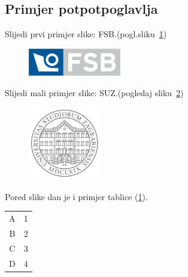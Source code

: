 \documentclass[a4paper,12pt]{report}
\begin{document}
\subsection{Primjer potpotpoglavlja}

Slijedi prvi primjer slike: FSB.(pogl.sliku~\ref{figa1})
%

\begin{figure}[h]
  \centering
  \includegraphics[height=1.2cm]{fsb_logo_n}\\
  \label{figa1}
\end{figure}

\clearpage
Slijedi mali primjer slike: SUZ.(pogledaj sliku~\ref{figa2})
%

\begin{figure}
  \centering
  \includegraphics[height=3.2cm]{unizg_sivi_t4s}\\
  \label{figa2}
\end{figure}


Pored slike dan je i primjer tablice (\ref{tablicaa}).

\begin{table}[!h]
\label{tablicaa}
  \centering
\begin{tabular}{|c c|} \hline
    A & 1 \\
    B & 2 \\
    C & 3 \\
    D & 4 \\ \hline
\end{tabular}
\end{table}
\end{document}

